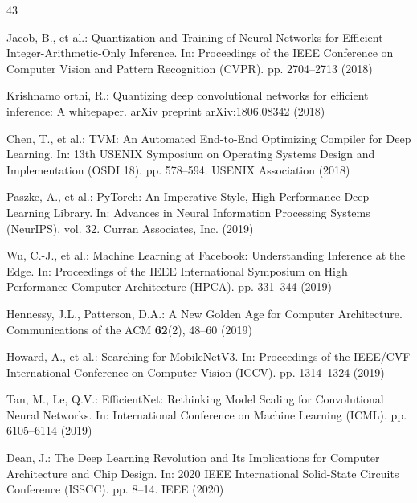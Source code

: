 \documentclass[conference]{IEEEtran}
\begin{document}
\begin{thebibliography}{43}

Jacob, B., et al.: Quantization and Training of Neural Networks for Efficient Integer-Arithmetic-Only Inference. In: Proceedings of the IEEE Conference on Computer Vision and Pattern Recognition (CVPR). pp. 2704--2713 (2018)


Krishnamo orthi, R.: Quantizing deep convolutional networks for efficient inference: A whitepaper. arXiv preprint arXiv:1806.08342 (2018)


Chen, T., et al.: TVM: An Automated End-to-End Optimizing Compiler for Deep Learning. In: 13th USENIX Symposium on Operating Systems Design and Implementation (OSDI 18). pp. 578--594. USENIX Association (2018)


Paszke, A., et al.: PyTorch: An Imperative Style, High-Performance Deep Learning Library. In: Advances in Neural Information Processing Systems (NeurIPS). vol. 32. Curran Associates, Inc. (2019)


Wu, C.-J., et al.: Machine Learning at Facebook: Understanding Inference at the Edge. In: Proceedings of the IEEE International Symposium on High Performance Computer Architecture (HPCA). pp. 331--344 (2019)


Hennessy, J.L., Patterson, D.A.: A New Golden Age for Computer Architecture. Communications of the ACM \textbf{62}(2), 48--60 (2019)


Howard, A., et al.: Searching for MobileNetV3. In: Proceedings of the IEEE/CVF International Conference on Computer Vision (ICCV). pp. 1314--1324 (2019)


Tan, M., Le, Q.V.: EfficientNet: Rethinking Model Scaling for Convolutional Neural Networks. In: International Conference on Machine Learning (ICML). pp. 6105--6114 (2019)


Dean, J.: The Deep Learning Revolution and Its Implications for Computer Architecture and Chip Design. In: 2020 IEEE International Solid-State Circuits Conference (ISSCC). pp. 8--14. IEEE (2020)


\end{thebibliography}
\end{document}

